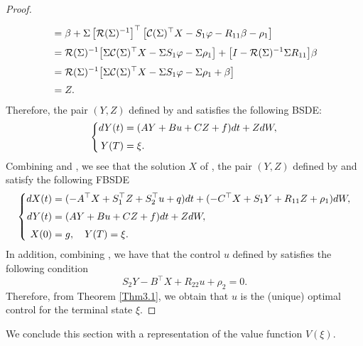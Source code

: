 \documentclass[11pt,times,twoside]{article}
\def\ba{\begin{aligned}}              \def\ea{\end{aligned}}
\begin{document}
\begin{proof}
\begin{align*}
%
\ns\ds &=\beta+\Si\left[\mathcal{R}(\Si)^{-1}\right]^{\top}\big[\mathcal{C}(\Si)^{\top} X-S_{1} \varphi-R_{11} \beta  -\rho_1 \big] \\
%
\ns\ds &=\mathcal{R}(\Si)^{-1}\big[\Si \mathcal{C}(\Si)^{\top} X-\Si S_{1} \varphi
 -\Si\rho_1 \big]+\big[I-\mathcal{R}(\Si)^{-1} \Si R_{11}\big] \beta \\
%
\ns\ds &=\mathcal{R}(\Si)^{-1}\big[\Si \mathcal{C}(\Si)^{\top} X-\Si S_{1} \varphi
 -\Si\rho_1+ \beta \big]\\
\ns\ds &=Z.
\end{align*}
%
Therefore, the pair $(Y,Z)$ defined by  and  satisfies the following BSDE:
%
\begin{equation}\label{4.12}\left\{\ba
\ds dY(t) &=(A Y+B u+C Z+ f ) d t+Z d W, \\
\ns\ds  Y(T) &=\xi.
\ea\right.
\end{equation}
%
Combining  and , we see that the solution $X$ of , the pair $(Y,Z)$
defined by  and  satisfy the following FBSDE
%
\begin{equation}\label{FBSDE}\left\{\ba
\ds dX(t) &= (-A^{\top} X+S_{1}^{\top} Z+S_{2}^{\top} u +q  ) d t
+ (-C^{\top} X+S_{1} Y+R_{11} Z +\rho_1  ) d W, \\
%
\ns\ds dY(t) &=(A Y+B u+C Z +f ) d t+Z d W, \\
%
\ns\ds X(0) &=g, \q Y(T)=\xi.
\ea\right.
\end{equation}
%
In addition, combining , we have that the control $u$ defined by  satisfies the following condition
%
\begin{equation}\label{4.13}
S_{2} Y-B^{\top} X+R_{22} u +\rho_2=0.
\end{equation}
%
Therefore, from Theorem \ref{Thm3.1}, we obtain that $u$ is the (unique) optimal control for the terminal state $\xi$.
%
\end{proof}

We conclude this section with a representation of the value function $V(\xi)$.
\end{document}
